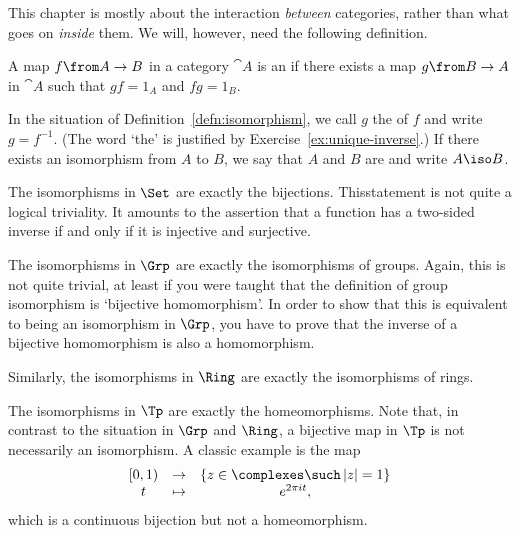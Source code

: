 This chapter is mostly about the interaction \emph{between} categories,
rather than what goes on \emph{inside} them.  We will, however, need the
following definition.

\begin{defn}    
\label{defn:isomorphism}
A map $f\from A \to B$ in a category $\cat{A}$ is an %
%
%
if there exists a map $g\from B \to A$ in $\cat{A}$ such that $gf = 1_A$
and $fg = 1_B$.
\end{defn}

In the situation of Definition~\ref{defn:isomorphism}, we call $g$ the
%
%
%
of $f$ and write $g = f^{-1}$.%
%
%
(The word `the' is justified by Exercise~\ref{ex:unique-inverse}.)  If
there exists an isomorphism from $A$ to $B$, we say that $A$ and $B$ are
 and write $A \iso B$.%
%
%

\begin{example}
\label{eg:iso-Set}
The isomorphisms in $\Set$%
%
%
are exactly the bijections.  This\linebreak statement is not quite a logical
triviality.  It amounts to the assertion that a function has a two-sided
inverse if and only if it is injective and surjective.
\end{example}

\begin{example}
The isomorphisms in $\Grp$%
%
%
are exactly the isomorphisms of groups.  Again, this is not quite trivial,
at least if you were taught that the definition of group isomorphism is
`bijective homomorphism'.  In order to show that this is equivalent to
being an isomorphism in $\Grp$, you have to prove that the inverse of a
bijective homomorphism is also a homomorphism.

Similarly, the isomorphisms in $\Ring$%
%
%
are exactly the isomorphisms of rings.
\end{example}

\begin{example}
The isomorphisms in $\Tp$%
%
%
are exactly the homeomorphisms.  Note that, in contrast to the situation in
$\Grp$ and $\Ring$, a bijective map in $\Tp$ is not necessarily an
isomorphism.  A classic example is the map
\[
\begin{array}{ccc}
[0, 1)  &\to            &\{z \in \complexes \such \left|z\right| = 1\}     \\
t       &\mapsto        &e^{2\pi i t},
\end{array}
\]
which is a continuous bijection but not a homeomorphism.
\end{example}

